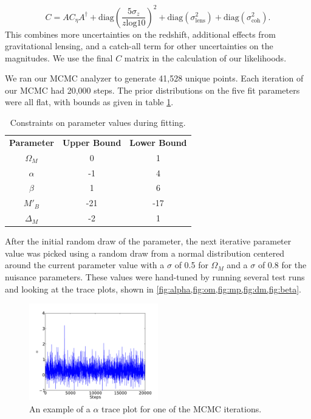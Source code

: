 \documentclass[aps,prl,reprint]{revtex4-1}
\begin{document}
$$C = A C_\eta A^\dagger + \text{diag}(\frac{5\sigma_z}{z \text{log} 10})^2 + \text{diag}(\sigma_\text{lens}^2) + \text{diag}(\sigma_{\text{coh}}^2). $$
This combines more uncertainties on the redshift, additional effects from gravitational lensing, and a catch-all term for other uncertainties on the magnitudes. We use the final $C$ matrix in the calculation of our likelihoods. 
\par We ran our MCMC analyzer to generate 41,528 unique points. Each iteration of our MCMC had 20,000 steps. The prior distributions on the five fit parameters were all flat, with bounds as given in table \ref{bounds}.
\begin{table}
\begin{center}
\begin{tabular}{ |c|c|c| } 
 \hline
 \textbf{Parameter} & \textbf{Upper Bound} & \textbf{Lower Bound} \\ 
 $\Omega_M$ & 0 & 1 \\ 
 $\alpha$ & -1 & 4 \\ 
 $\beta$ & 1 & 6 \\ 
 $M'_B$ & -21 & -17 \\ 
$\Delta_M$ & -2 & 1 \\ 
 \hline
\end{tabular}
\caption{Constraints on parameter values during fitting.}\label{bounds}
\end{center}
\end{table}
\par After the initial random draw of the parameter, the next iterative parameter value was picked using a random draw from a normal distribution centered around the current parameter value with a $\sigma$ of 0.5 for $\Omega_M$ and a $\sigma$ of 0.8 for the nuisance parameters. These values were hand-tuned by running several test runs and looking at the trace plots, shown in \cref{fig:alpha,fig:om,fig:mp,fig:dm,fig:beta}. 
\begin{figure}
 \includegraphics[width=0.5\textwidth]{../plots/alpha.pdf}
\caption{\label{fig:alpha}An example of a $\alpha$ trace plot for one of the MCMC iterations.}
\end{figure}
\end{document}
